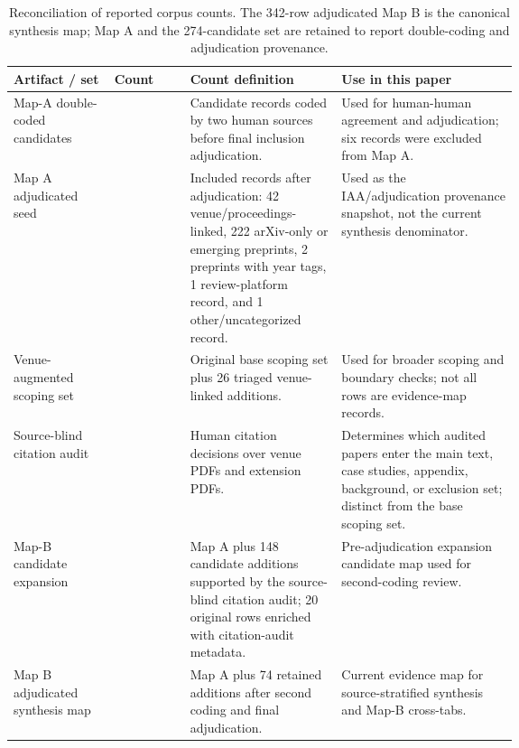 \begin{table}[t]
\centering
\scriptsize
\renewcommand{\arraystretch}{0.92}
\begin{tabularx}{\linewidth}{>{\raggedright\arraybackslash}p{0.20\linewidth}>{\raggedright\arraybackslash}p{0.15\linewidth}>{\raggedright\arraybackslash}p{0.30\linewidth}X}
\toprule
\textbf{Artifact / set} & \textbf{Count} & \textbf{Count definition} & \textbf{Use in this paper} \\
\midrule
Map-A double-coded candidates & 274 & Candidate records coded by two human sources before final inclusion adjudication. & Used for human-human agreement and adjudication; six records were excluded from Map A. \\
Map A adjudicated seed & 268 & Included records after adjudication: 42 venue/proceedings-linked, 222 arXiv-only or emerging preprints, 2 preprints with year tags, 1 review-platform record, and 1 other/uncategorized record. & Used as the IAA/adjudication provenance snapshot, not the current synthesis denominator. \\
Venue-augmented scoping set & 326 & Original base scoping set plus 26 triaged venue-linked additions. & Used for broader scoping and boundary checks; not all rows are evidence-map records. \\
Source-blind citation audit & 300 & Human citation decisions over venue PDFs and extension PDFs. & Determines which audited papers enter the main text, case studies, appendix, background, or exclusion set; distinct from the base scoping set. \\
Map-B candidate expansion & 416 & Map A plus 148 candidate additions supported by the source-blind citation audit; 20 original rows enriched with citation-audit metadata. & Pre-adjudication expansion candidate map used for second-coding review. \\
Map B adjudicated synthesis map & 342 & Map A plus 74 retained additions after second coding and final adjudication. & Current evidence map for source-stratified synthesis and Map-B cross-tabs. \\
\bottomrule
\end{tabularx}
\caption{Reconciliation of reported corpus counts. The 342-row adjudicated Map B is the canonical synthesis map; Map A and the 274-candidate set are retained to report double-coding and adjudication provenance.}
\label{tab:source-strata-reconciliation}
\end{table}
